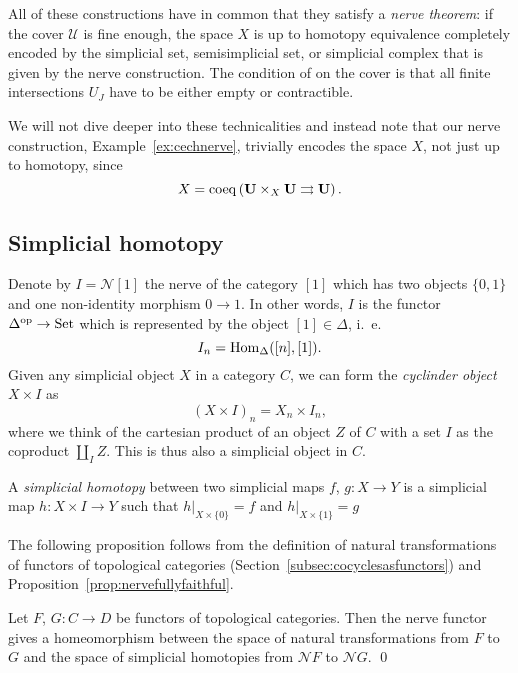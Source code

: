 \documentclass[a4paper,openany]{scrbook}
\newcommand{\nerve}{\mathcal N}
\begin{document}
All of these constructions have in common that they satisfy a \emph{nerve theorem}: if the cover $\mathcal U$ is fine enough, the space $X$ is up to homotopy equivalence completely encoded by the simplicial set, semisimplicial set, or simplicial complex that is given by the nerve construction. The condition of on the cover is that all finite intersections $U_J$ have to be either empty or contractible.

We will not dive deeper into these technicalities and instead note that our nerve construction, Example~\ref{ex:cechnerve}, trivially encodes the space $X$, not just up to homotopy, since
\[
X = \operatorname{coeq} \left( \mathbf U \times_X \mathbf U \rightrightarrows \mathbf U\right).
\]

\subsection{Simplicial homotopy}

Denote by $I=\nerve [1]$ the nerve of the category $[1]$ which has two objects $\{0,1\}$ and one non-identity morphism $0 \to 1$. In other words, $I$ is the functor $\Delta^{\operatorname{op}}\to\operatorname{Set}$ which is represented by the object $[1] \in \Delta$, i.~e.
\[
I_n = \operatorname{Hom}_{\Delta}([n],[1]).
\]
Given any simplicial object $X$ in a category $C$, we can form the \emph{cyclinder object} $X \times I$ as
\[
(X \times I)_n = X_n \times I_n,
\]
where we think of the cartesian product of an object $Z$ of $C$ with a set $I$ as the coproduct $\coprod_I Z$. This is thus also a simplicial object in $C$.

\begin{defn}
A \emph{simplicial homotopy} between two simplicial maps $f$, $g\colon X \to Y$ is a simplicial map $h\colon X \times I \to Y$ such that $h|_{X \times \{0\}} = f$ and $h|_{X \times \{1\}} = g$
\end{defn}

The following proposition follows from the definition of natural transformations of functors of topological categories (Section~\ref{subsec:cocyclesasfunctors}) and Proposition~\ref{prop:nervefullyfaithful}.

\begin{prop}
Let $F$, $G\colon C \to D$ be functors of topological categories. Then the nerve functor gives a homeomorphism between the space of natural transformations from $F$ to $G$ and the space of simplicial homotopies from $\nerve F$ to $\nerve G$. \qed
\end{prop}
\end{document}
